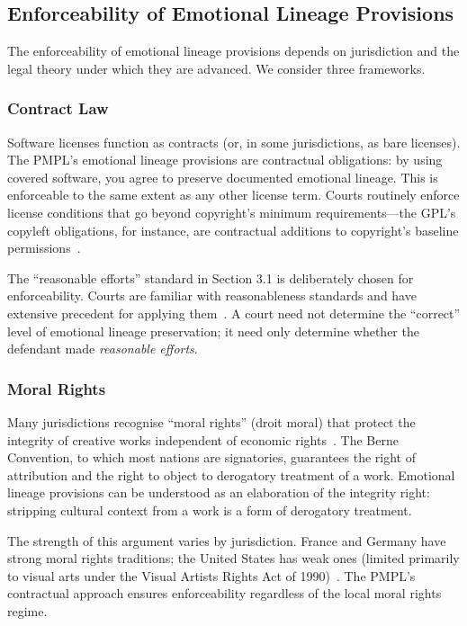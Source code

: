\documentclass[11pt,twocolumn]{article}
\begin{document}
\subsection{Enforceability of Emotional Lineage Provisions}

The enforceability of emotional lineage provisions depends on jurisdiction
and the legal theory under which they are advanced. We consider three
frameworks.

\subsubsection{Contract Law}

Software licenses function as contracts (or, in some jurisdictions, as
bare licenses). The PMPL's emotional lineage provisions are contractual
obligations: by using covered software, you agree to preserve documented
emotional lineage. This is enforceable to the same extent as any other
license term. Courts routinely enforce license conditions that go beyond
copyright's minimum requirements---the GPL's copyleft obligations, for
instance, are contractual additions to copyright's baseline
permissions~\cite{jacobsen2008}.

The ``reasonable efforts'' standard in Section 3.1 is deliberately
chosen for enforceability. Courts are familiar with reasonableness
standards and have extensive precedent for applying
them~\cite{farnsworth2004contracts}. A court need not determine the
``correct'' level of emotional lineage preservation; it need only
determine whether the defendant made \emph{reasonable efforts}.

\subsubsection{Moral Rights}

Many jurisdictions recognise ``moral rights'' (droit moral) that protect
the integrity of creative works independent of economic
rights~\cite{berne1886}. The Berne Convention, to which most nations are
signatories, guarantees the right of attribution and the right to object
to derogatory treatment of a work. Emotional lineage provisions can be
understood as an elaboration of the integrity right: stripping cultural
context from a work is a form of derogatory treatment.

The strength of this argument varies by jurisdiction. France and Germany
have strong moral rights traditions; the United States has weak ones
(limited primarily to visual arts under the Visual Artists Rights Act of
1990)~\cite{vara1990}. The PMPL's contractual approach ensures
enforceability regardless of the local moral rights regime.
\end{document}
